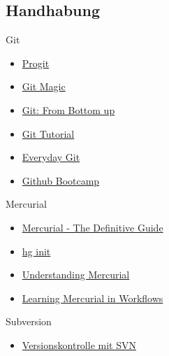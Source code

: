 \documentclass[presentation]{beamer}
\begin{document}
\subsection{Handhabung}
\begin{frame}{Git}
  \begin{itemize}[<+->]
  \item \href{http://progit.org/book/}{Progit}
  \item \href{http://www-cs-students.stanford.edu/~blynn/gitmagic/}{Git Magic}
  \item \href{http://www.newartisans.com/2008/04/git-from-the-bottom-up.html}{Git: From Bottom up}
  \item \href{http://www.kernel.org/pub/software/scm/git/docs/gittutorial.html}{Git Tutorial}
  \item \href{http://www.kernel.org/pub/software/scm/git/docs/everyday.html}{Everyday Git}
  \item \href{http://help.github.com/}{Github Bootcamp}
  \end{itemize}
\end{frame}
\begin{frame}{Mercurial}
  \begin{itemize}[<+->]
  \item \href{http://hgbook.red-bean.com/}{Mercurial - The Definitive Guide}
  \item \href{http://hginit.com/}{hg init}
  \item \href{http://mercurial.selenic.com/wiki/UnderstandingMercurial}{Understanding Mercurial}
  \item \href{http://mercurial.selenic.com/guide/}{Learning Mercurial in Workflows}
  \end{itemize}
\end{frame}
\begin{frame}{Subversion}
  \begin{itemize}
  \item \href{http://svnbook.red-bean.com/}{Versionskontrolle mit SVN}
  \end{itemize}
\end{frame}
\end{document}
